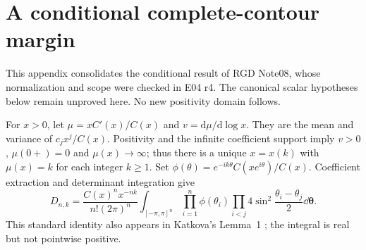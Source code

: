 \section{A conditional complete-contour margin}\label{sec:contour}
This appendix consolidates the conditional result of RGD Note08, whose
normalization and scope were checked in E04 r4. The canonical scalar
hypotheses below remain unproved here. No new positivity domain follows.

For $x>0$, let $\mu=xC'(x)/C(x)$ and
$v=\mathrm d\mu/\mathrm d\log x$. They are the mean and variance of
$c_jx^j/C(x)$. Positivity and the infinite coefficient support imply
$v>0$, $\mu(0+)=0$ and $\mu(x)\to\infty$; thus there is a unique
$x=x(k)$ with $\mu(x)=k$ for each integer $k\ge1$. Set
$\phi(\theta)=e^{-ik\theta}C(xe^{i\theta})/C(x)$.
Coefficient extraction and determinant integration give
\begin{equation}\label{eq:contour-int}
 D_{n,k}=\frac{C(x)^nx^{-nk}}{n!(2\pi)^n}
 \int_{[-\pi,\pi]^n}\prod_{i=1}^n\phi(\theta_i)
 \prod_{i<j}4\sin^2\frac{\theta_i-\theta_j}{2}\dd\boldsymbol\theta.
\end{equation}
This standard identity also appears in Katkova's Lemma~1
\cite{Katkova0505174v1}; the integral is real but not pointwise positive.

